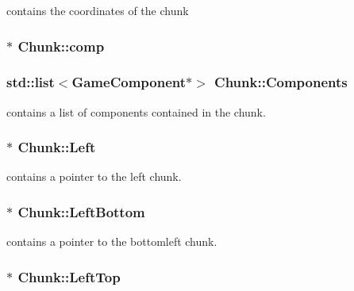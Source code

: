contains the coordinates of the chunk 

\hypertarget{class_chunk_a633545d862acb016a7081c364126c7b8}{
\subsubsection[{comp}]{ $\ast$ Chunk\-::comp}}\label{class_chunk_a633545d862acb016a7081c364126c7b8}
\hypertarget{class_chunk_a4cdf6febd96ff99b681e37d548617a38}{
\subsubsection[{Components}]{\setlength{\rightskip}{0pt plus 5cm}std\-::list$<${\bf Game\-Component}$\ast$$>$ Chunk\-::\-Components\hspace{0.3cm}{\ttfamily [private]}}}\label{class_chunk_a4cdf6febd96ff99b681e37d548617a38}


contains a list of components contained in the chunk. 

\hypertarget{class_chunk_aee27c2584364a58dc8811e9ada0695dd}{
\subsubsection[{Left}]{$\ast$ Chunk\-::\-Left\hspace{0.3cm}{\ttfamily [private]}}}\label{class_chunk_aee27c2584364a58dc8811e9ada0695dd}


contains a pointer to the left chunk. 

\hypertarget{class_chunk_af3577f37139ffeb74181d9ce3c48f5e6}{
\subsubsection[{Left\-Bottom}]{$\ast$ Chunk\-::\-Left\-Bottom\hspace{0.3cm}{\ttfamily [private]}}}\label{class_chunk_af3577f37139ffeb74181d9ce3c48f5e6}


contains a pointer to the bottomleft chunk. 

\hypertarget{class_chunk_a877d51226eaa97c40c05223987514d59}{
\subsubsection[{Left\-Top}]{$\ast$ Chunk\-::\-Left\-Top\hspace{0.3cm}{\ttfamily [private]}}}\label{class_chunk_a877d51226eaa97c40c05223987514d59}


